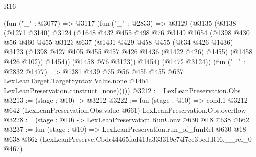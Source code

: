 \begin{lexlean}{R16}
\begin{coremodule}
          (fun ("_" : @3077) =>
          @3117
            (fun ("_" : @2833) =>
            @3129
              (@3135
                (@3138
                  (@1271 @3140)
                  @3124
                  (@1648
                    @432
                    @455
                    @498
                    @76
                    @3140
                    @1654
                    (@1398
                      @430
                      @56
                      @460
                      @455
                      @3123
                      @637
                      (@1431
                        @429
                        @458
                        @455
                        (@634 @426 @1436)
                        @3123
                        (@1398 @427 @105 @455 @457 @426 @1436 (@1422 @426) @1455)
                        (@1458 @426 @102))
                      @1454))
                  (@1458 @76 @3123))
                @1454)
              (@1472 @3124))
            (fun ("_" : @2832 @1477) =>
            @1381
              @439
              @35
              @56
              @455
              @455
              @637
              LexLeanTarget.TargetSyntax.Value.none
              @1454
              LexLeanPreservation.construct_none)))))
@3212 := LexLeanPreservation.Obs
@3213 := (stage : @10) -> @3212
@3222 := fun (stage : @10) =>
  cond.{1} @3212 @642 (LexLeanPreservation.Obs.value @661) LexLeanPreservation.Obs.overflow
@3228 := (stage : @10) -> LexLeanPreservation.RunConv @630 @18 @638 @662
@3237 := fun (stage : @10) =>
  LexLeanPreservation.run_of_funRel
    @630
    @18
    @638
    @662
    (LexLeanPreserve.Cbdc44465fad413a333319c74f7ce3bed.R16.__rel_0 @467)
\end{coremodule}
\end{lexlean}
